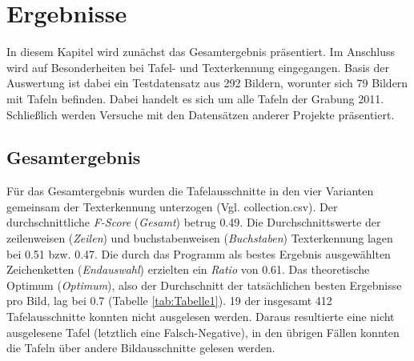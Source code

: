 \section{Ergebnisse}

In diesem Kapitel wird zunächst das Gesamtergebnis präsentiert. Im Anschluss wird auf Besonderheiten bei Tafel- und Texterkennung eingegangen. Basis der Auswertung ist dabei ein Testdatensatz aus 292 Bildern, worunter sich 79 Bildern mit Tafeln befinden. Dabei handelt es sich um alle Tafeln der Grabung 2011.
Schließlich werden Versuche mit den Datensätzen anderer Projekte präsentiert.

\subsection{Gesamtergebnis}
Für das Gesamtergebnis wurden die Tafelausschnitte in den vier Varianten gemeinsam der Texterkennung unterzogen (Vgl. collection.csv). Der durchschnittliche  \textit{F-Score} (\textit{Gesamt}) betrug 0.49. Die Durchschnittswerte der zeilenweisen (\textit{Zeilen}) und buchstabenweisen (\textit{Buchstaben}) Texterkennung lagen bei 0.51 bzw. 0.47. Die durch das Programm als bestes Ergebnis ausgewählten Zeichenketten (\textit{Endauswahl}) erzielten ein \textit{Ratio} von 0.61. Das theoretische Optimum (\textit{Optimum}), also der Durchschnitt der tatsächlichen besten Ergebnisse pro Bild, lag bei 0.7 (Tabelle \ref{tab:Tabelle1}). 19 der insgesamt 412 Tafelausschnitte konnten nicht ausgelesen werden. Daraus resultierte eine nicht ausgelesene Tafel (letztlich eine Falsch-Negative), in den übrigen Fällen konnten die Tafeln über andere Bildausschnitte gelesen werden.
\\
